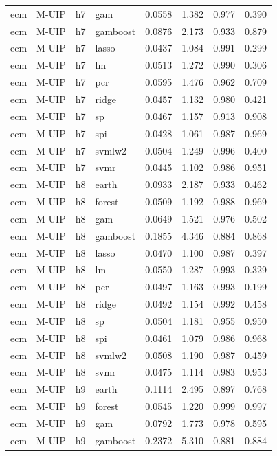 \begin{ThreePartTable}
\begin{longtable}[t]{llclcccc}
ecm & M-UIP & h7 & gam & 0.0558 & 1.382 & 0.977 & 0.390\\
ecm & M-UIP & h7 & gamboost & 0.0876 & 2.173 & 0.933 & 0.879\\
ecm & M-UIP & h7 & lasso & 0.0437 & 1.084 & 0.991 & 0.299\\
ecm & M-UIP & h7 & lm & 0.0513 & 1.272 & 0.990 & 0.306\\
ecm & M-UIP & h7 & pcr & 0.0595 & 1.476 & 0.962 & 0.709\\
ecm & M-UIP & h7 & ridge & 0.0457 & 1.132 & 0.980 & 0.421\\
ecm & M-UIP & h7 & sp & 0.0467 & 1.157 & 0.913 & 0.908\\
ecm & M-UIP & h7 & spi & 0.0428 & 1.061 & 0.987 & 0.969\\
ecm & M-UIP & h7 & svmlw2 & 0.0504 & 1.249 & 0.996 & 0.400\\
ecm & M-UIP & h7 & svmr & 0.0445 & 1.102 & 0.986 & 0.951\\
\addlinespace
ecm & M-UIP & h8 & earth & 0.0933 & 2.187 & 0.933 & 0.462\\
ecm & M-UIP & h8 & forest & 0.0509 & 1.192 & 0.988 & 0.969\\
ecm & M-UIP & h8 & gam & 0.0649 & 1.521 & 0.976 & 0.502\\
ecm & M-UIP & h8 & gamboost & 0.1855 & 4.346 & 0.884 & 0.868\\
ecm & M-UIP & h8 & lasso & 0.0470 & 1.100 & 0.987 & 0.397\\
ecm & M-UIP & h8 & lm & 0.0550 & 1.287 & 0.993 & 0.329\\
ecm & M-UIP & h8 & pcr & 0.0497 & 1.163 & 0.993 & 0.199\\
ecm & M-UIP & h8 & ridge & 0.0492 & 1.154 & 0.992 & 0.458\\
ecm & M-UIP & h8 & sp & 0.0504 & 1.181 & 0.955 & 0.950\\
ecm & M-UIP & h8 & spi & 0.0461 & 1.079 & 0.986 & 0.968\\
ecm & M-UIP & h8 & svmlw2 & 0.0508 & 1.190 & 0.987 & 0.459\\
ecm & M-UIP & h8 & svmr & 0.0475 & 1.114 & 0.983 & 0.953\\
\addlinespace
ecm & M-UIP & h9 & earth & 0.1114 & 2.495 & 0.897 & 0.768\\
ecm & M-UIP & h9 & forest & 0.0545 & 1.220 & 0.999 & 0.997\\
ecm & M-UIP & h9 & gam & 0.0792 & 1.773 & 0.978 & 0.595\\
ecm & M-UIP & h9 & gamboost & 0.2372 & 5.310 & 0.881 & 0.884\\

\end{longtable}
\end{ThreePartTable}
